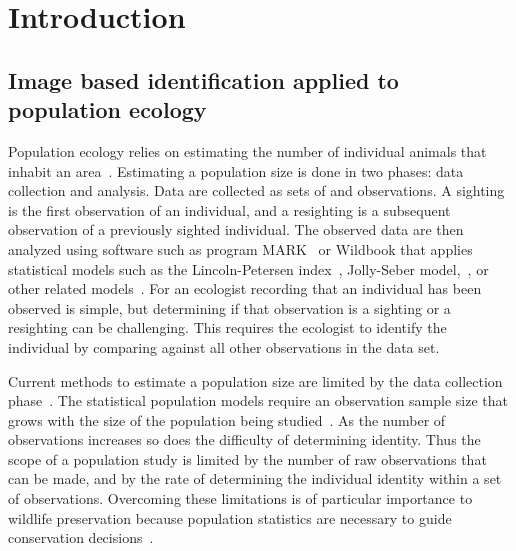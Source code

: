 \begin{comment}
    ./texfix.py --outline --fpaths chapter1-intro.tex
    ./texfix.py --fpaths chapter1-intro.tex --outline --asmarkdown --numlines=999  -w
    ./texfix.py --grep "\\\\[A-Za-z]*[^{a-zA-Z]"
    ./texfix.py --reformat --fpaths figdef1.tex
\end{comment}


\chapter{Introduction}\label{chap:intro}

\section{Image based identification applied to population ecology}

    Population ecology relies on estimating the number of individual animals that inhabit an
    area~\cite{krebs_ecological_1999}. Estimating a population size is done in two phases: data collection and
    analysis. Data are collected as sets of  and  observations. A
    sighting is the first observation of an individual, and a resighting is a subsequent observation of a
    previously sighted individual. The observed data are then analyzed using software such as program
    MARK~\cite{white_program_1999, schwarz_jolly_seber_2006} or Wildbook that applies statistical models such as
    the Lincoln-Petersen index~\cite{seber_estimation_1982}, Jolly-Seber model,~\cite{jolly_explicit_1965,
    seber_note_1965}, or other related models~\cite{cormack_estimates_1964,
    chao_estimating_1987,kenneth._h._pollock_statistical_1990}. For an ecologist recording that an individual has
    been observed is simple, but determining if that observation is a sighting or a resighting can be challenging.
    This requires the ecologist to identify the individual by comparing against all other observations in the data
    set.

    Current methods to estimate a population size are limited by the data collection
    phase~\cite{sundaresan_network_2007, rubenstein_ecology_2010}. The statistical population models require an
    observation sample size that grows with the size of the population being studied~\cite{seber_estimation_1982}.
    As the number of observations increases so does the difficulty of determining identity. Thus the scope of a
    population study is limited by the number of raw observations that can be made, and by the rate of determining
    the individual identity within a set of observations. Overcoming these limitations is of particular importance
    to wildlife preservation because population statistics are necessary to guide conservation
    decisions~\cite{rubenstein_behavioral_1998}.

